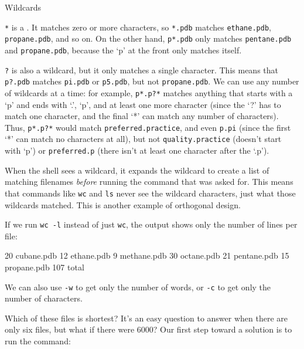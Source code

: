 \begin{swcbox}{Wildcards}

\texttt{*} is a . It matches zero or more
characters, so \texttt{*.pdb} matches \texttt{ethane.pdb},
\texttt{propane.pdb}, and so on. On the other hand, \texttt{p*.pdb} only
matches \texttt{pentane.pdb} and \texttt{propane.pdb}, because the `p'
at the front only matches itself.

\texttt{?} is also a wildcard, but it only matches a single character.
This means that \texttt{p?.pdb} matches \texttt{pi.pdb} or
\texttt{p5.pdb}, but not \texttt{propane.pdb}. We can use any number of
wildcards at a time: for example, \texttt{p*.p?*} matches anything that
starts with a `p' and ends with `.', `p', and at least one more
character (since the `?' has to match one character, and the final `*'
can match any number of characters). Thus, \texttt{p*.p?*} would match
\texttt{preferred.practice}, and even \texttt{p.pi} (since the first `*'
can match no characters at all), but not \texttt{quality.practice}
(doesn't start with `p') or \texttt{preferred.p} (there isn't at least
one character after the `.p').

When the shell sees a wildcard, it expands the wildcard to create a list
of matching filenames \emph{before} running the command that was asked
for. This means that commands like \texttt{wc} and \texttt{ls} never see
the wildcard characters, just what those wildcards matched. This is
another example of orthogonal design.

\end{swcbox}

If we run \texttt{wc -l} instead of just \texttt{wc}, the output shows
only the number of lines per file:


\begin{VerbOut}
  20  cubane.pdb
  12  ethane.pdb
   9  methane.pdb
  30  octane.pdb
  21  pentane.pdb
  15  propane.pdb
 107  total
\end{VerbOut}

We can also use \texttt{-w} to get only the number of words, or
\texttt{-c} to get only the number of characters.

Which of these files is shortest? It's an easy question to answer when
there are only six files, but what if there were 6000? Our first step
toward a solution is to run the command:

